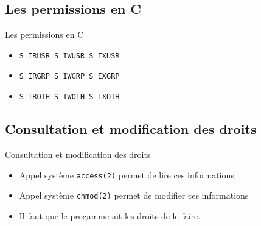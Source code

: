 \begin{frame}{\sectitle}
\def\subsectitle{Les permissions en C}
\subsection{\subsectitle}
\begin{exampleblock}{\subsectitle}
\begin{itemize}
    \item \texttt{S\_IRUSR S\_IWUSR S\_IXUSR}
    \item \texttt{S\_IRGRP S\_IWGRP S\_IXGRP}
    \item \texttt{S\_IROTH S\_IWOTH S\_IXOTH}
\end{itemize}
\end{exampleblock}

\def\subsectitle{Consultation et modification des droits}
\subsection{\subsectitle}
\begin{block}{\subsectitle}
\begin{itemize}
    \item Appel système \texttt{access(2)} permet de lire ces informations
    \item Appel système \texttt{chmod(2)} permet de modifier ces informations
    \item Il faut que le progamme ait les droits de le faire.
\end{itemize}
\end{block}
\end{frame}



\def\sectitle{Représentation symolique interne}
